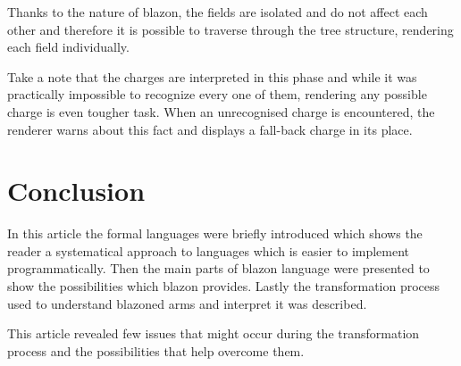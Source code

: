 \documentclass[12pt,a4paper]{article}
\let\oldsection\section
\renewcommand\section{\clearpage\oldsection}
\begin{document}
Thanks to the nature of blazon, the fields are isolated and do not affect each other and therefore it is possible to traverse through the tree structure, rendering each field individually.

Take a note that the charges are interpreted in this phase and while it was practically impossible to recognize every one of them, rendering any possible charge is even tougher task.
When an unrecognised charge is encountered, the renderer warns about this fact and displays a fall-back charge in its place.

\section{Conclusion}
In this article the formal languages were briefly introduced which shows the reader a systematical approach to languages which is easier to implement programmatically.
Then the main parts of blazon language were presented to show the possibilities which blazon provides.
Lastly the transformation process used to understand blazoned arms and interpret it was described.

This article revealed few issues that might occur during the transformation process and the possibilities that help overcome them.



{\raggedright\small
	
}

\end{document}
